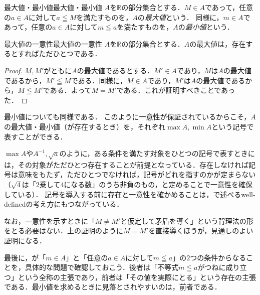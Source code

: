\begin{definition}{最大値・最小値}{最大値・最小値}
  $A$を$\mathbb{R}$の部分集合とする．$M \in A$であって，任意の$a \in A$に対して$a \leqq M$を満たすものを，$A$の\emph{最大値}という．
  同様に，$m \in A$であって，任意の$a \in A$に対して$m \leqq a$を満たすものを，$A$の\emph{最小値}という．
\end{definition}

\begin{prop}{最大値の一意性}{最大値の一意性}
  $A$を$\mathbb{R}$の部分集合とする．$A$の最大値は，存在するとすればただひとつである．
\end{prop}

\begin{tleftbar}
  \begin{proof}
    $M,M'$がともに$A$の最大値であるとする．$M' \in A$であり，$M$は$A$の最大値であるから，$M' \leqq M$である．同様に，$M \in A$であり，$M'$は$A$の最大値であるから，$M \leqq M'$である．よって$M = M'$である．これが証明すべきことであった．
  \end{proof}
\end{tleftbar}

最小値についても同様である．
このように一意性が保証されているからこそ，$A$の最大値・最小値（が存在するとき）を，それぞれ$\max A,\min A$という記号で表すことができる．

\begin{remark}[一意性と記号]
  $\max A$や$A^{-1},\sqrt{a}$のように，ある条件を満たす対象をひとつの記号で表すときには，その対象がただひとつ存在することが前提となっている．存在しなければ記号は意味をもたず，ただひとつでなければ，記号がどれを指すのかが定まらない（$\sqrt{4}$は「$2$乗して$4$になる数」のうち非負のもの，と定めることで一意性を確保している）．
  記号を導入する前に存在と一意性を確かめることは，で述べるwell-definedの考え方にもつながっている．
\end{remark}

なお，一意性を示すときに「$M \ne M'$と仮定して矛盾を導く」という背理法の形をとる必要はない．上の証明のように$M = M'$を直接導くほうが，見通しのよい証明になる．

最後に，が「$m \in A$」と「任意の$a \in A$に対して$m \leqq a$」の$2$つの条件からなることを，具体的な問題で確認しておこう．後者は「不等式$m \leqq a$がつねに成り立つ」という全称の主張であり，前者は「その値を実際にとる」という存在の主張である．最小値を求めるときに見落とされやすいのは，前者である．


